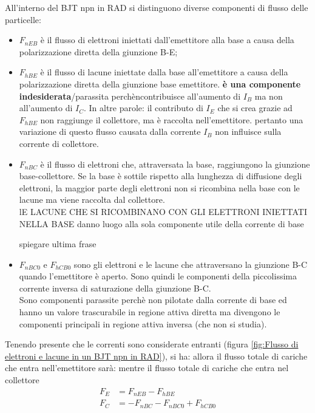 All'interno del BJT npn in RAD si distinguono diverse componenti di flusso delle particelle:
\begin{itemize}
    \item $F_{nEB}$ è il flusso di elettroni iniettati dall'emettitore alla base a causa della polarizzazione diretta della giunzione B-E;
    
    \item $F_{hBE}$ è il flusso di lacune iniettate dalla base all'emettitore a causa della polarizzazione diretta della giunzione base emettitore. \textbf{è una componente indesiderata}/parassita perchèncontribuisce all'aumento di $I_B$ ma non all'aumento di $I_C$. In altre parole: il contributo di  $I_E$ che si crea grazie ad $F_{hBE}$ non raggiunge il collettore, ma è raccolta nell'emettitore. pertanto una variazione di questo flusso causata dalla corrente $I_B$ non influisce sulla corrente di collettore.
    
    \item $F_{nBC}$ è il flusso di elettroni che, attraversata la base, raggiungono la giunzione base-collettore. Se la base è sottile rispetto alla lunghezza di diffusione degli elettroni, la maggior parte degli elettroni non si ricombina nella base con le lacune ma viene raccolta dal collettore.\\
    lE LACUNE CHE SI RICOMBINANO CON GLI ELETTRONI INIETTATI NELLA BASE danno luogo alla sola componente utile della corrente di base
    \begin{ricevimento}
        spiegare ultima frase
    \end{ricevimento}
    \item $F_{nBC0}$ e $F_{hCB0}$ sono gli elettroni e le lacune che attraversano la giunzione B-C quando l'emettitore è aperto. Sono quindi le componenti della piccolissima corrente inversa di saturazione della giunzione B-C.\\
    Sono componenti parassite perchè non pilotate dalla corrente di base ed hanno un valore trascurabile in regione attiva diretta ma divengono le componenti principali in regione attiva inversa (che non si studia).
    
\end{itemize}
Tenendo presente che le correnti sono considerate entranti (figura \ref{fig:Flusso di elettroni e lacune in un BJT npn in RAD}), si ha:
allora il flusso totale di cariche che entra nell'emettitore sarà:
mentre il flusso totale di cariche che entra nel collettore
\begin{align}
F_E &= F_{nEB}-F_{hBE}\\
    F_C &= -F_{nBC}-F_{nBC0}+F_{hCB0}
\end{align}

